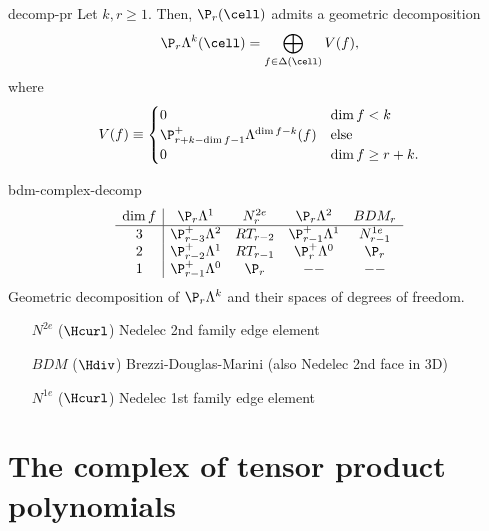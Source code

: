 \begin{Theorem}{decomp-pr}
  Let $k,r\ge 1$. Then, $\P_r(\cell)$ admits a geometric decomposition
  \begin{gather}
    \P_r\Lambda^k(\cell) = \bigoplus_{f\in\Delta(\cell)} V(f),
  \end{gather}
  where
  \begin{gather}
    V(f) \equiv
    \begin{cases}
      0 & \dim f < k\\
      \P_{r+k-\dim f-1}^+ \Lambda^{\dim f-k}(f) &\text{else}\\
      0 & \dim f \ge r+k.
    \end{cases}
  \end{gather}
\end{Theorem}

\begin{Example}{bdm-complex-decomp}
  \begin{gather}
    \begin{array}{c|cccc}
      \dim f
      & \P_r\Lambda^1 & N^{2e}_r
      & \P_r\Lambda^2 & BDM_r \\\hline
      3 & \P_{r-3}^+\Lambda^2 & RT_{r-2} & \P_{r-1}^+\Lambda^1 & N^{1e}_{r-1} \\
      2 & \P_{r-2}^+\Lambda^1 & RT_{r-1} & \P_{r}^+\Lambda^0 & \P_r \\
      1 & \P_{r-1}^+\Lambda^0 & \P_r & --& --
    \end{array}
  \end{gather}
  Geometric decomposition of $\P_r\Lambda^k$ and their spaces of degrees of freedom.
  \begin{itemize}
  \item [$N^{2e}$] ($\Hcurl$) Nedelec 2nd family edge element
  \item [$BDM$] ($\Hdiv$) Brezzi-Douglas-Marini (also Nedelec 2nd face in 3D)
  \item [$N^{1e}$] ($\Hcurl$) Nedelec 1st family edge element
  \end{itemize}
\end{Example}



\section{The complex of tensor product polynomials}


